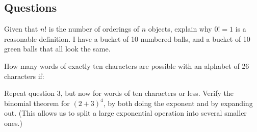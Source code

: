 \subsection*{Questions}
\begin{questions}
  \question Given that $ n! $ is the number of orderings of $ n $ objects, explain why $ 0! = 1 $ is a reasonable definition.
  \question I have a bucket of 10 numbered balls, and a bucket of 10 green balls that all look the same.
  \question How many words of exactly ten characters are possible with an alphabet of 26 characters if:
  \question Repeat question 3, but now for words of ten characters or less.
  \question Verify the binomial theorem for $ (2 + 3)^4 $, by both doing the exponent and by expanding out. (This allows us to
            split a large exponential operation into several smaller ones.)
  \question
\end{questions}
